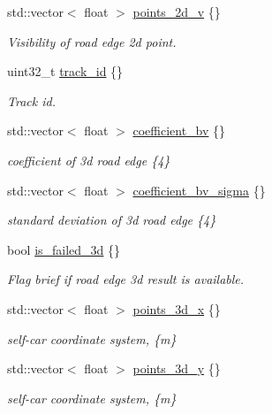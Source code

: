 \begin{DoxyCompactItemize}
std\+::vector$<$ float $>$ \hyperlink{structmaf__perception__interface_1_1RoadEdge_a4c85d702ac800ec13d5f90180d4a65d0}{points\+\_\+2d\+\_\+v} \{\}
\begin{DoxyCompactList}\small\item\em Visibility of road edge 2d point. \end{DoxyCompactList}\item 
uint32\+\_\+t \hyperlink{structmaf__perception__interface_1_1RoadEdge_a18201dfa0dc9e0287fa212737f8229fb}{track\+\_\+id} \{\}
\begin{DoxyCompactList}\small\item\em Track id. \end{DoxyCompactList}\item 
std\+::vector$<$ float $>$ \hyperlink{structmaf__perception__interface_1_1RoadEdge_ab52ece3a3271ef2cb71b5e790c672ed6}{coefficient\+\_\+bv} \{\}
\begin{DoxyCompactList}\small\item\em coefficient of 3d road edge \{4\} \end{DoxyCompactList}\item 
std\+::vector$<$ float $>$ \hyperlink{structmaf__perception__interface_1_1RoadEdge_ac8f18e65568291f2ec040869878be4dc}{coefficient\+\_\+bv\+\_\+sigma} \{\}
\begin{DoxyCompactList}\small\item\em standard deviation of 3d road edge \{4\} \end{DoxyCompactList}\item 
bool \hyperlink{structmaf__perception__interface_1_1RoadEdge_afb9ef48a459cdf5d851d4bdbfcbbddc6}{is\+\_\+failed\+\_\+3d} \{\}
\begin{DoxyCompactList}\small\item\em Flag brief if road edge 3d result is available. \end{DoxyCompactList}\item 
std\+::vector$<$ float $>$ \hyperlink{structmaf__perception__interface_1_1RoadEdge_ae69e18ec91c5d9c98266faef4c6853d9}{points\+\_\+3d\+\_\+x} \{\}
\begin{DoxyCompactList}\small\item\em self-\/car coordinate system, \{m\} \end{DoxyCompactList}\item 
std\+::vector$<$ float $>$ \hyperlink{structmaf__perception__interface_1_1RoadEdge_a37c4e73177be7748614aa52cf157f446}{points\+\_\+3d\+\_\+y} \{\}
\begin{DoxyCompactList}\small\item\em self-\/car coordinate system, \{m\} \end{DoxyCompactList}\item 

\end{DoxyCompactItemize}
